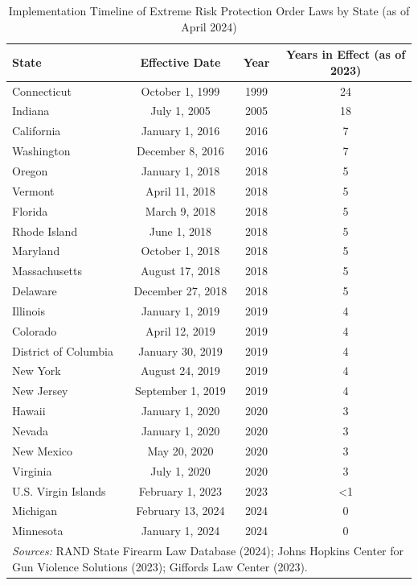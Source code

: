 \documentclass[,ijds,nonblindrev]{informs}
\begin{document}
\begin{APPENDICES}
\begin{table}[ht]
\centering
\caption{Implementation Timeline of Extreme Risk Protection Order Laws by State (as of April 2024)}
\label{tab:erpo_timeline}
\begin{tabular}{lccc}
\toprule
\textbf{State} & \textbf{Effective Date} & \textbf{Year} & \textbf{Years in Effect (as of 2023)} \\
\midrule
Connecticut & October 1, 1999 & 1999 & 24 \\
Indiana & July 1, 2005 & 2005 & 18 \\
California & January 1, 2016 & 2016 & 7 \\
Washington & December 8, 2016 & 2016 & 7 \\
Oregon & January 1, 2018 & 2018 & 5 \\
Vermont & April 11, 2018 & 2018 & 5 \\
Florida & March 9, 2018 & 2018 & 5 \\
Rhode Island & June 1, 2018 & 2018 & 5 \\
Maryland & October 1, 2018 & 2018 & 5 \\
Massachusetts & August 17, 2018 & 2018 & 5 \\
Delaware & December 27, 2018 & 2018 & 5 \\
Illinois & January 1, 2019 & 2019 & 4 \\
Colorado & April 12, 2019 & 2019 & 4 \\
District of Columbia & January 30, 2019 & 2019 & 4 \\
New York & August 24, 2019 & 2019 & 4 \\
New Jersey & September 1, 2019 & 2019 & 4 \\
Hawaii & January 1, 2020 & 2020 & 3 \\
Nevada & January 1, 2020 & 2020 & 3 \\
New Mexico & May 20, 2020 & 2020 & 3 \\
Virginia & July 1, 2020 & 2020 & 3 \\
U.S. Virgin Islands & February 1, 2023 & 2023 & <1 \\
Michigan & February 13, 2024 & 2024 & 0 \\
Minnesota & January 1, 2024 & 2024 & 0 \\
\bottomrule
\multicolumn{4}{p{.97\linewidth}}{\small \textit{Sources:} RAND State Firearm Law Database (2024); Johns Hopkins Center for Gun Violence Solutions (2023); Giffords Law Center (2023).}
\end{tabular}
\end{table}


\end{APPENDICES}
\end{document}

